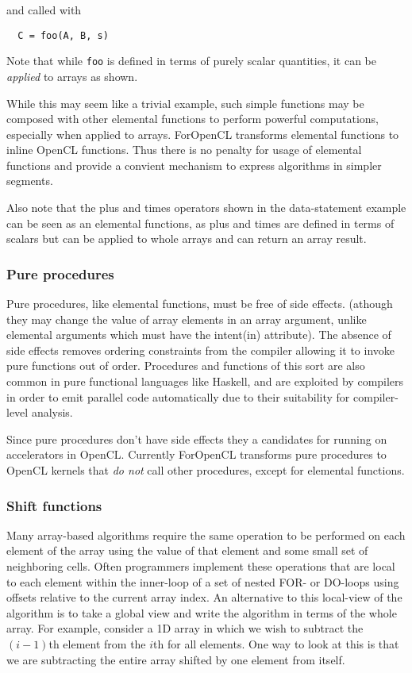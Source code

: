 \noindent and called with

{\small
\begin{verbatim}
  C = foo(A, B, s)
\end{verbatim}
}

Note that while {\tt foo} is defined in terms of purely scalar
quantities, it can be \emph{applied} to arrays as shown.

While this may seem like a trivial example, such simple functions may be
composed with other elemental functions to perform powerful computations,
especially when applied to arrays.  ForOpenCL transforms elemental functions to inline OpenCL
functions.  Thus there is no penalty for usage of elemental functions and provide
a convient mechanism to express algorithms in simpler segments.

Also note that the plus and times operators shown in the data-statement
example can be seen as an elemental functions, as plus and times are defined
in terms of scalars but can be applied to whole arrays and can return an array
result.

\subsubsection*{Pure procedures}

Pure procedures, like elemental functions, must be free of side effects.
(athough they may change the value of array elements in an array argument,
unlike elemental arguments which must have the intent(in) attribute).
The absence of side effects removes ordering constraints from the compiler
allowing it to invoke pure functions out of order.  Procedures and functions
of this sort are also common in pure functional languages like Haskell,
and are exploited by compilers in order to emit parallel code automatically
due to their suitability for compiler-level analysis.

Since pure procedures don't have side effects they a candidates for running on
accelerators in OpenCL.  Currently ForOpenCL transforms pure procedures to
OpenCL kernels that \emph{do not} call other procedures, except for elemental
functions.

\subsubsection*{Shift functions}

Many array-based algorithms require the same operation to be performed
on each element of the array using the value of that element and some small
set of neighboring cells.  Often programmers implement these operations that
are local to each element within the inner-loop of a set of nested FOR-
or DO-loops using offsets relative to the current array index.  An alternative
to this local-view of the algorithm is to take a global view and write the
algorithm in terms of the whole array.  For example, consider a 1D array in
which we wish to subtract the $(i-1)$th element from the $i$th for all
elements.  One way to look at this is that we are subtracting the entire array
shifted by one element from itself.

